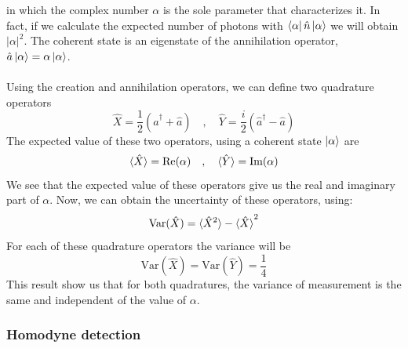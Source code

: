 in which the complex number $\alpha$ is the sole parameter that characterizes it.
In fact, if we calculate the expected number of photons with $\bra{\alpha} \hat{n} \ket{\alpha}$ we will obtain $|\alpha|^2$. The coherent state is an eigenstate of the annihilation operator, $\hat{a}\ket{\alpha} = \alpha \ket{\alpha}$.\\
\\
%
%
Using the creation and annihilation operators, we can define two quadrature operators
\cite{loudon2000}
%
\begin{equation}
\hat{X} = \frac{1}{2} \left( \hat{a}^\dagger + \hat{a} \right)
\quad , \quad
\hat{Y} = \frac{i}{2} \left( \hat{a}^\dagger - \hat{a} \right)
\end{equation}
%
The expected value of these two operators, using a coherent state $\ket{\alpha}$ are
%
\begin{equation}
\braket{\hat{X}} = \textrm{Re}(\alpha)
\quad , \quad
\braket{\hat{Y}} = \textrm{Im}(\alpha)
\end{equation}
%
We see that the expected value of these operators give us the real and imaginary part of $\alpha$. Now, we can obtain the uncertainty of these operators, using:
%
\begin{equation}
\textrm{Var}(\hat{X}) = \braket{\hat{X}^2} - \braket{\hat{X}}^2
\end{equation}
%
For each of these quadrature operators the variance will be
%
\begin{equation}
\textrm{Var}(\hat{X}) = \textrm{Var}(\hat{Y}) = \frac{1}{4}
\end{equation}
%
This result show us that for both quadratures, the variance of measurement is the same and independent of the value of $\alpha$.
%
%
%
\subsubsection{Homodyne detection}

